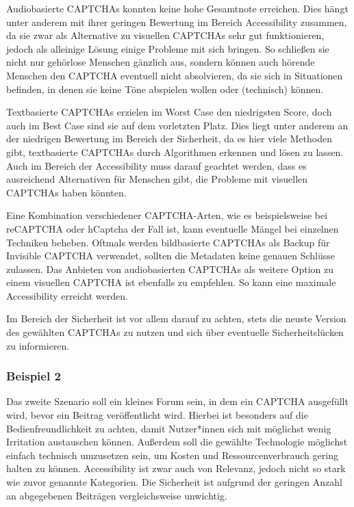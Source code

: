 Audiobasierte CAPTCHAs konnten keine hohe Gesamtnote erreichen.
Dies hängt unter anderem mit ihrer geringen Bewertung im Bereich Accessibility zusammen,
da sie zwar als Alternative zu visuellen CAPTCHAs sehr gut funktionieren, jedoch als alleinige Lösung einige Probleme mit sich bringen.
So schließen sie nicht nur gehörlose Menschen gänzlich aus, sondern können auch hörende Menschen den CAPTCHA eventuell nicht absolvieren,
da sie sich in Situationen befinden, in denen sie keine Töne abspielen wollen oder (technisch) können.

Textbasierte CAPTCHAs erzielen im Worst Case den niedrigsten Score, doch auch im Best Case sind sie auf dem vorletzten Platz.
Dies liegt unter anderem an der niedrigen Bewertung im Bereich der Sicherheit, 
da es hier viele Methoden gibt, textbasierte CAPTCHAs durch Algorithmen erkennen und lösen zu lassen.
Auch im Bereich der Accessibility muss darauf geachtet werden, dass es ausreichend Alternativen für Menschen gibt,
die Probleme mit visuellen CAPTCHAs haben könnten.

Eine Kombination verschiedener CAPTCHA-Arten, wie es beispielsweise bei reCAPTCHA oder hCaptcha der Fall ist, 
kann eventuelle Mängel bei einzelnen Techniken beheben.
Oftmals werden bildbasierte CAPTCHAs als Backup für Invisible CAPTCHA verwendet, sollten die Metadaten keine genauen Schlüsse zulassen.
Das Anbieten von audiobasierten CAPTCHAs als weitere Option zu einem visuellen CAPTCHA ist ebenfalls zu empfehlen.
So kann eine maximale Accessibility erreicht werden.

Im Bereich der Sicherheit ist vor allem darauf zu achten, stets die neuste Version des gewählten CAPTCHAs zu nutzen 
und sich über eventuelle Sicherheitslücken zu informieren.

\subsubsection*{Beispiel 2}
Das zweite Szenario soll ein kleines Forum sein, in dem ein CAPTCHA ausgefüllt wird, bevor ein Beitrag veröffentlicht wird.
Hierbei ist besonders auf die Bedienfreundlichkeit zu achten, damit Nutzer*innen sich mit möglichst wenig Irritation austauschen können.
Außerdem soll die gewählte Technologie möglichst einfach technisch umzusetzen sein, um Kosten und Ressourcenverbrauch gering halten zu können.
Accessibility ist zwar auch von Relevanz, jedoch nicht so stark wie zuvor genannte Kategorien.
Die Sicherheit ist aufgrund der geringen Anzahl an abgegebenen Beiträgen vergleichsweise unwichtig.

